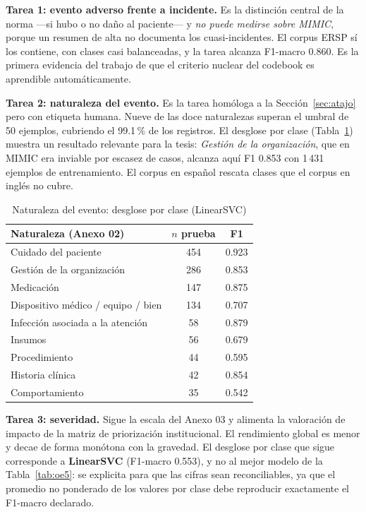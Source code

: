 \documentclass[conference]{IEEEtran}
\begin{document}
\textbf{Tarea 1: evento adverso frente a incidente.} Es la distinción central
de la norma ---si hubo o no daño al paciente--- y \emph{no puede medirse sobre
MIMIC}, porque un resumen de alta no documenta los cuasi-incidentes. El
corpus ERSP sí los contiene, con clases casi balanceadas, y la tarea alcanza
F1-macro 0.860. Es la primera evidencia del trabajo de que el criterio nuclear
del codebook es aprendible automáticamente.

\textbf{Tarea 2: naturaleza del evento.} Es la tarea homóloga a la
Sección~\ref{sec:atajo} pero con etiqueta humana. Nueve de las doce
naturalezas superan el umbral de 50 ejemplos, cubriendo el 99.1\,\% de los
registros. El desglose por clase (Tabla~\ref{tab:oe5clases}) muestra un
resultado relevante para la tesis: \emph{Gestión de la organización}, que en
MIMIC era inviable por escasez de casos, alcanza aquí F1 0.853 con 1\,431
ejemplos de entrenamiento. El corpus en español rescata clases que el corpus
en inglés no cubre.

\begin{table}[htbp]
\caption{Naturaleza del evento: desglose por clase (LinearSVC)}
\label{tab:oe5clases}
\centering
\footnotesize
\begin{tabular}{@{}lcc@{}}
\toprule
\textbf{Naturaleza (Anexo 02)} & \textbf{$n$ prueba} & \textbf{F1} \\
\midrule
Cuidado del paciente & 454 & 0.923 \\
Gestión de la organización & 286 & 0.853 \\
Medicación & 147 & 0.875 \\
Dispositivo médico / equipo / bien & 134 & 0.707 \\
Infección asociada a la atención & 58 & 0.879 \\
Insumos & 56 & 0.679 \\
Procedimiento & 44 & 0.595 \\
Historia clínica & 42 & 0.854 \\
Comportamiento & 35 & 0.542 \\
\bottomrule
\end{tabular}
\end{table}

\textbf{Tarea 3: severidad.} Sigue la escala del Anexo 03 y alimenta la
valoración de impacto de la matriz de priorización institucional. El
rendimiento global es menor y decae de forma monótona con la gravedad. El
desglose por clase que sigue corresponde a \textbf{LinearSVC}
(F1-macro 0.553),
y no al mejor modelo de la Tabla~\ref{tab:oe5}: se explicita para que las
cifras sean reconciliables, ya que el promedio no ponderado de los valores por
clase debe reproducir exactamente el F1-macro declarado.
\end{document}
